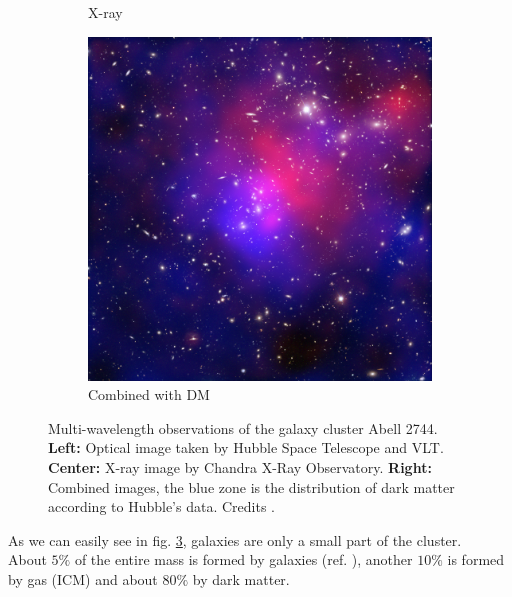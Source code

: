 \begin{figure}[h!]
\begin{subfigure}{0.31\textwidth}
        \caption{X-ray}
        \label{fig:chandra_abell2744}
    \end{subfigure}
    \hspace{2mm}
    \begin{subfigure}{0.31\textwidth}
        \centering
        \includegraphics[width=\linewidth]{Images/Chapter3/a2744.jpg}
        \caption{Combined with DM}
        \label{fig:combined_abell2744}
    \end{subfigure}
    \caption[Multi-wavelength observations of galaxy cluster Abell 2744]{
        Multi-wavelength observations of the galaxy cluster Abell 2744. 
        \textbf{Left:} Optical image taken by Hubble Space Telescope and VLT. 
        \textbf{Center:} X-ray image by Chandra X-Ray Observatory. 
        \textbf{Right:} Combined images, the blue zone is the distribution of dark matter according to Hubble's data. Credits \cite{chandra-a2744}.
    }
    \label{fig:abell2744_multiwavelength}
\end{figure}
As we can easily see in fig. \ref{fig:abell2744_multiwavelength}, galaxies are only a small part of the cluster.\\ 
About $5\%$ of the entire mass is formed by galaxies (ref. \cite{Gonzalez_2007}), another $10\%$ is formed by gas (ICM) and about $80\%$ by dark matter.

